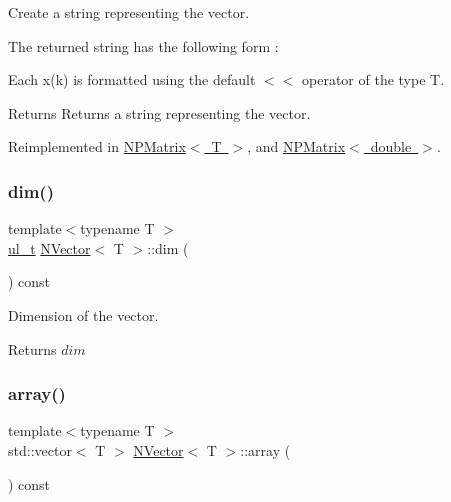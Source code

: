 Create a string representing the vector. 

The returned string has the following form \+:


\begin{DoxyCode}{0}
\end{DoxyCode}
 Each {\ttfamily x(k)} is formatted using the default {\ttfamily $<$$<$} operator of the type {\ttfamily T}.

\begin{DoxyReturn}{Returns}
Returns a string representing the vector. 
\end{DoxyReturn}


Reimplemented in \mbox{\hyperlink{class_n_p_matrix_ac60d089a0a4b6d0a1df3cf549f50028d}{N\+P\+Matrix$<$ T $>$}}, and \mbox{\hyperlink{class_n_p_matrix_ac60d089a0a4b6d0a1df3cf549f50028d}{N\+P\+Matrix$<$ double $>$}}.

\mbox{\label{class_n_vector_a7589027db20509ac4d93490bb9a1979a}} 
\subsubsection{\texorpdfstring{dim()}{dim()}}
{\footnotesize\ttfamily template$<$typename T $>$ \\
\mbox{\hyperlink{typedef_8h_a1b140a2034db3f5dfe18a987745df43a}{ul\+\_\+t}} \mbox{\hyperlink{class_n_vector}{N\+Vector}}$<$ T $>$\+::dim (\begin{DoxyParamCaption}{ }\end{DoxyParamCaption}) const}



Dimension of the vector. 

\begin{DoxyReturn}{Returns}
$ dim $ 
\end{DoxyReturn}
\mbox{\label{class_n_vector_aa99d9fea7e30357df42f736013506fe1}} 
\subsubsection{\texorpdfstring{array()}{array()}}
{\footnotesize\ttfamily template$<$typename T $>$ \\
std\+::vector$<$ T $>$ \mbox{\hyperlink{class_n_vector}{N\+Vector}}$<$ T $>$\+::array (\begin{DoxyParamCaption}{ }\end{DoxyParamCaption}) const}



